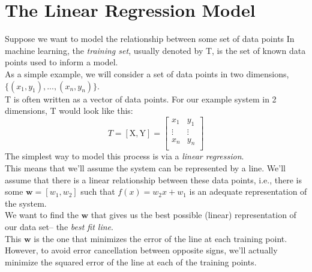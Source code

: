\documentclass[11pt]{article}
\begin{document}
\section{The Linear Regression Model}
Suppose we want to model the relationship between some set of data points
In machine learning, the \textit{training set}, usually denoted by T, is the
set of known data points used to inform a model.  \\[1ex]
As a simple example, we will consider a set of data points in two dimensions, 
$\{(x_1, y_1), ... , (x_n, y_n)\}$. \\[1ex]
T is often written as a vector of data points. For our example
system in 2 dimensions, T would look like this:
\begin{equation*}
	T
=
	\left[\mathrm{X}, \mathrm{Y} \right]
=
	\left[
		\begin{array}{cc}
			x_1    & y_1 \\
			\vdots & \vdots \\
			x_n    & y_n \\
		\end{array}
	\right]
\end{equation*}
The simplest way to model this process is via a \textit{linear regression}.\\[1ex]
This means that we'll assume the system can be represented by a line.
We'll assume that there is a linear relationship between these data points,
i.e., there is some $\mathbf{w} = [w_1, w_2]$ such that $f(x) = w_2 x + w_1$ is
an adequate representation of the system. \\
We want to find the $\mathbf{w}$ that gives us the best possible (linear)
representation of our data set-- the \textit{best fit line}. \\
This $\mathbf{w}$ is the one that minimizes the error of the line at each
training point. \\[1ex]
However, to avoid error cancellation between opposite signs, we'll actually
minimize the squared error of the line at each of the training points.
\end{document}
